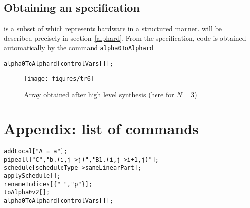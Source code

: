 \subsection{Obtaining an {\alphard} specification}

{\alphard} is a subset of {\Alpha} which represents hardware in a
structured manner. {\alphard} will be described precisely in
section~\ref{alphard}.  From the {\alphaz} specification, {\alphard}
code is obtained automatically by the command {\tt alpha0ToAlphard}

\begin{verbatim}
alpha0ToAlphard[controlVars[]];
\end{verbatim}

\begin{figure}[htbp]
\centerline{\texttt{[image: figures/tr6]}}
\caption{Array obtained after high level synthesis (here for $N=3$)}
\label{figder8}
\end{figure}

\section{Appendix: list of commands}
\begin{verbatim}
addLocal["A = a"];
pipeall["C","b.(i,j->j)","B1.(i,j->i+1,j)"];
schedule[scheduleType->sameLinearPart];
applySchedule[];
renameIndices[{"t","p"}];
toAlpha0v2[];
alpha0ToAlphard[controlVars[]];
\end{verbatim}
